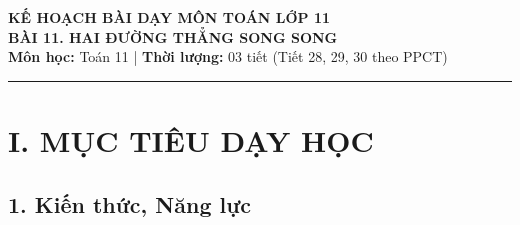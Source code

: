 \documentclass[12pt, a4paper]{article}
\begin{document}
\begin{center}
    {\Large \textbf{KẾ HOẠCH BÀI DẠY MÔN TOÁN LỚP 11}}\\[0.4em]
    {\LARGE \textbf{BÀI 11. HAI ĐƯỜNG THẲNG SONG SONG}}\\[0.5em]
    \textbf{Môn học:} Toán 11 | \textbf{Thời lượng:} 03 tiết (Tiết 28, 29, 30 theo PPCT)
\end{center}

\vspace{0.5em}
\hrule
\vspace{1em}

\section*{I. MỤC TIÊU DẠY HỌC}

\subsection*{1. Kiến thức, Năng lực}
\end{document}
